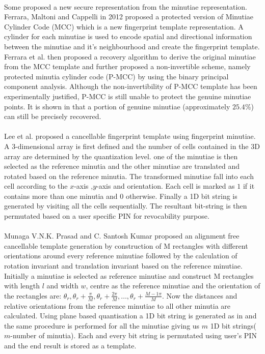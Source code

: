 \documentclass[14pt, oneside]{article}   	%
\begin{document}
\paragraph{}
Some proposed a new secure representation from the minutiae representation. Ferrara, Maltoni and Cappelli in 2012 proposed a protected version of Minutiae Cylinder Code (MCC) which is a new fingerprint template representation\cite{9}. A cylinder for each minutiae is used to encode spatial and directional information between the minutiae and it's neighbourhood and create the fingerprint template.
Ferrara et al.\cite{10} then proposed a recovery algorithm to derive the original minutiae from the MCC template and further proposed  a non-invertible scheme, namely protected minutia cylinder code (P-MCC) by using the binary principal component analysis. Although the non-invertibility of P-MCC template has been experimentally justified, P-MCC is still unable to protect the genuine minutiae points. It is shown in \cite{10} that a portion of genuine minutiae (approximately $25.4\%$) can still be precisely recovered.
\paragraph{}
Lee et al. \cite{11} proposed a cancellable fingerprint template using fingerprint minutiae. A 3-dimensional array is first defined and the number of cells contained in the 3D array are determined by the quantization level. one of the minutiae is then selected as the reference minutia and the other minutiae are translated and rotated based on the reference minutia. The transformed minutiae fall into each cell according to the $x$-axis ,$y$-axis and orientation. Each cell is marked as $1$ if it contains more than one minutia and $0$ otherwise. Finally a 1D bit string is generated by visiting all the cells sequentially. The resultant bit-string is then permutated based on a user specific PIN for revocability purpose. 
\paragraph{}
Munaga V.N.K. Prasad and C. Santosh Kumar \cite{12} proposed an alignment free cancellable template generation by construction of M rectangles with different orientations around every reference minutiae followed by the calculation of rotation invariant and translation invariant based on the reference minutiae. Initially a minutiae is selected as reference minutiae and construct M rectangles with length $l$ and width $w$, centre as the reference minutiae and the orientation of the rectangles are: $\theta_{r},\theta_{r}+\frac{\pi}{M},\theta_{r}+\frac{2\pi}{M},\ldots,\theta_{r}+\frac{M-1\pi}{M}$. Now the distances and relative orientations from the reference minutiae to all other minutia are calculated. Using plane based quantisation a 1D bit string is generated as in \cite{11} and the same procedure is performed for all the minutiae giving us $m$ 1D bit strings($m$-number of minutia). Each and every bit string is permutated using user's PIN and the end result is stored as a template.
\end{document}
